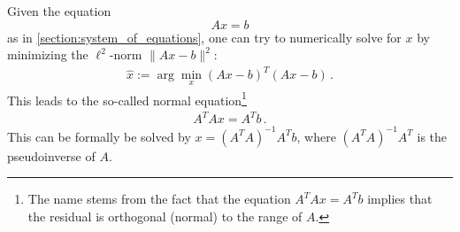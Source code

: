     \begin{method}\label{data:normal_equation}
        Given the equation \[Ax=b\] as in \cref{section:system_of_equations}, one can try to numerically solve for $x$ by minimizing the $\ell^2$-norm $\|Ax-b\|^2$:
        \begin{gather}
            \hat{x}:=\arg\min_x(Ax-b)^T(Ax-b)\,.
        \end{gather}
        This leads to the so-called normal equation\footnote{The name stems from the fact that the equation $A^TAx = A^Tb$ implies that the residual is orthogonal (normal) to the range of $A$.}
        \begin{gather}
            A^TAx = A^Tb\,.
        \end{gather}
        This can be formally be solved by $x=(A^TA)^{-1}A^Tb$, where $(A^TA)^{-1}A^T$ is the pseudoinverse of $A$.
    \end{method}

